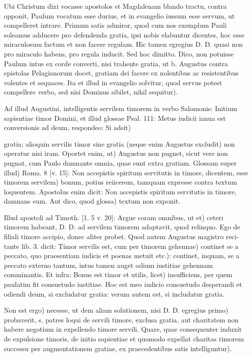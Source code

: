 Ubi Christum dixi vocasse apostolos et Magdalenam blando tractu, contra opponit, Paulum vocatum esse durius, et in evangelio iussum esse servum, ut compelleret intrare. Primum satis admiror, quod cum nos exemplum Pauli soleamus adducere pro defendenda gratia, ipsi nobis elabuntur dicentes, hoc esse miraculosum factum et non facere regulam. Hic tamen egregius D. D. quasi non pro miraculo habens, pro regula inducit. Sed hoc dimitto. Dico, non potuisse Paulum intus ex corde converti, nisi trahente gratia, ut b. Augustus contra epistolas Pelagianorum docet, gratiam dei facere ex nolentibus ac resistentibus volentes et sequaces. Ita et illud in evangelio solvitur, quod servus potest compellere verbo, sed nisi Dominus sibilet, nihil sequitur).

Ad illud Augustini, intelligentis servilem timorem in verbo Salomonis: Initium sapientiae timor Domini, et illud glossae Psal. 111: Metus iudicii ianua est conversionis ad deum, respondeo: Si adsit)

gratia; alioquin servilis timor sine gratia (neque enim Augustus excludit) non operatur nisi iram. Oportet enim, ut) Augustus non pugnet, sicut vere non pugnat, cum Paulo damnante omnia, quae sunt extra gratiam. Glossam super illud) Roma. 8 [v. 15]: Non accepistis spiritum servitutis in timore, dicentem, esse timorem servilem) bonum, potius reiicerem, tamquam expresse contra textum loquentem. Apostolus enim dicit: Non accepistis spiritum servitutis in timore, damnans eum. Aut dico, quod glossa) textum non exponit.

Illud apostoli ad Timoth. [1. 5 v. 20]: Argue coram omnibus, ut et) ceteri timorem habeant, D. D. ad servilem timorem adaptavit, quod relinquo. Ego de filiali timore accipio, donec aliter probet. Quod autem Augustus magistro reci-\marginpar{\small[371]}tante lib. 3. dicit: Timor servilis est, cum per timorem gehennae) continet se a peccato, quo praesentiam iudicis et poenas metuit etc.): continet, inquam, se a peccato externo tantum, intus tamen auget odium iustitiae gehennam comminantis. Et infra: Bonus est timor et utilis, licet) insufficiens, per quem paulatim fit consuetudo iustitiae. Hoc est meo iudicio consuetudo desperandi et odiendi deum, si excludatur gratia: verum autem est, si includatur gratia.

Non est ergo) necesse, ut dem aliam solutionem, nisi D. D. egregius primo) probaverit, s. patres loqui de servili timore, exclusa gratia, aut charitatem non habere negotium in expellendo timore servili. Quare, quae consequenter induxit de expulsione timoris, de initio sapientiae et quomodo expellat charitas timorem successu per augmentationem gratiae, ex praecedentibus satis intelliguntur).

